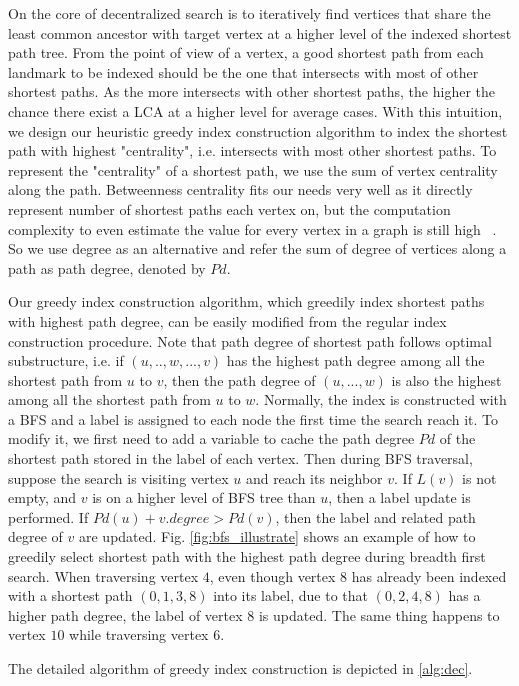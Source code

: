 On the core of decentralized search is to iteratively find vertices that share the least common ancestor with target vertex at a higher level of the indexed shortest path tree. From the point of view of a vertex, a good shortest path from each landmark to be indexed should be the one that intersects with most of other shortest paths. As the more intersects with other shortest paths, the higher the chance there exist a LCA at a higher level for average cases. With this intuition, we design our heuristic greedy index construction algorithm to index the shortest path with highest "centrality", i.e. intersects with most other shortest paths. To represent the "centrality" of a shortest path, we use the sum of vertex centrality along the path. Betweenness centrality fits our needs very well as it directly represent number of shortest paths each vertex on, but the computation complexity to even estimate the value for every vertex in a graph is still high ~\cite{Riondato:2014:FAB:2556195.2556224}. So we use degree as an alternative and refer the sum of degree of vertices along a path as path degree, denoted by $Pd$.

Our greedy index construction algorithm, which greedily index shortest paths with highest path degree, can be easily modified from the regular index construction procedure. Note that path degree of shortest path follows optimal substructure, i.e. if $(u, .., w, ..., v)$ has the highest path degree among all the shortest path from $u$ to $v$, then the path degree of $(u, ..., w)$ is also the highest among all the shortest path from $u$ to $w$. Normally, the index is constructed with a BFS and a label is assigned to each node the first time the search reach it. To modify it, we first need to add a variable to cache the path degree $Pd$ of the shortest path stored in the label of each vertex. Then during BFS traversal, suppose the search is visiting vertex $u$ and reach its neighbor $v$. If $L(v)$ is not empty, and $v$ is on a higher level of BFS tree than $u$, then a label update is performed. If $Pd(u) + v.degree > Pd(v)$, then the label and related path degree of $v$ are updated. Fig. \ref{fig:bfs_illustrate} shows an example of how to greedily select shortest path with the highest path degree during breadth first search. When traversing vertex $4$, even though vertex $8$ has already been indexed with a shortest path $(0, 1, 3, 8)$ into its label, due to that $(0, 2, 4, 8)$ has a higher path degree, the label of vertex $8$ is updated. The same thing happens to vertex $10$ while traversing vertex $6$.

The detailed algorithm of greedy index construction is depicted in \ref{alg:dec}.